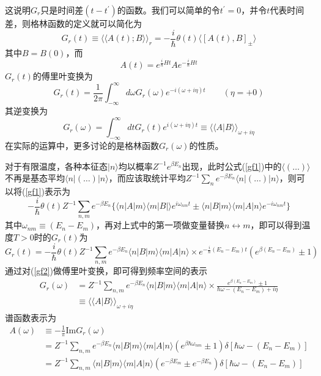 这说明$G_r$只是时间差$(t-t^{'})$的函数。我们可以简单的令$t^{'}=0$，并令$t$代表时间差，则格林函数的定义就可以简化为
\begin{equation}
G_r(t)\equiv\langle\langle A(t);B\rangle\rangle_r=-\frac{i}{\hbar}\theta(t)\langle\left[A(t),B\right]_\pm\rangle\label{gf1}
\end{equation}
其中$B=B(0)$，而
\begin{equation}
A(t)=e^{\frac{i}{\hbar}H t}Ae^{-\frac{i}{\hbar }H t}
\end{equation}
$G_r(t)$的傅里叶变换为
\begin{equation}
G_r(t)=\frac{1}{2\pi}\int_{-\infty}^{\infty}d\omega G_r(\omega)e^{-i(\omega+i\eta)t}\qquad(\eta=+0)
\end{equation}
其逆变换为
\begin{equation}
G_r(\omega)=\int_{-\infty}^{\infty}dtG_r(t)e^{i(\omega+i\eta)t}\equiv\langle\langle A|B\rangle\rangle_{\omega+i\eta}\label{gr}
\end{equation}
在实际的运算中，更多讨论的是格林函数$G_r(\omega)$的性质。

\qquad 对于有限温度，各种本征态$|n\rangle$均以概率$Z^{-1}e^{\beta E_n}$出现，此时公式(\ref{gf1})中的$\langle(\dots)\rangle$不再是基态平均$\langle n|(\dots)|n\rangle$，而应该取统计平均$Z^{-1}\sum_ne^{-\beta E_n}\langle n|(\dots)|n\rangle$，则可以将(\ref{gf1})表示为
\begin{equation}
-\frac{i}{\hbar}\theta(t)Z^{-1}\sum_{n,m}e^{-\beta E_n}\{\langle n|A|m\rangle\langle m|B|\rangle e^{i\omega_{nm}t}\pm\langle n|B|m\rangle\langle m|A|n\rangle e^{-i\omega_{nm}t}\}
\end{equation}
其中$\omega_{nm}\equiv(E_n-E_m)$，再对上式中的第一项做变量替换$n\leftrightarrow m$，即可以得到温度$T>0$时的$G_r(t)$为
\begin{equation}
G_r(t)=-\frac{i}{\hbar}\theta(t)Z^{-1}\sum_{n,m}e^{-\beta E_n}\langle n|B|m\rangle\langle m|A|n\rangle\times e^{-\frac{i}{\hbar}(E_n-E_m)t}(e^{\beta(E_n-E_m)}\pm 1)\label{gf2}
\end{equation}
通过对(\ref{gf2})做傅里叶变换，即可得到频率空间的表示
\begin{equation}
\begin{aligned}
G_r(\omega)&=Z^{-1}\sum_{n,m}e^{-\beta E_n}\langle n|B|m\rangle\langle m|A|n\rangle\times\frac{e^{\beta(E_n-E_m)}\pm 1}{\hbar\omega-(E_n-E_m)+i\eta}\\
&\equiv\langle\langle A|B\rangle\rangle_{\omega+i\eta}\label{gf3}
\end{aligned}
\end{equation}
谱函数表示为
\begin{equation}
\begin{aligned}
A(\omega)&\equiv-\frac{1}{\pi}\mathrm{Im}G_r(\omega)\\
&=Z^{-1}\sum_{n,m}e^{-\beta E_n}\langle n|B|m\rangle\langle  m|A|n\rangle(e^{\beta\hbar\omega_{nm}}\pm 1)\delta\left[\hbar\omega-(E_n-E_m)\right]\\
&=Z^{-1}\sum_{n,m}\langle n|B|m\rangle\langle  m|A|n\rangle(e^{-\beta E_m}\pm e^{-\beta E_n})\delta\left[\hbar\omega-(E_n-E_m)\right]
\end{aligned}
\end{equation}

